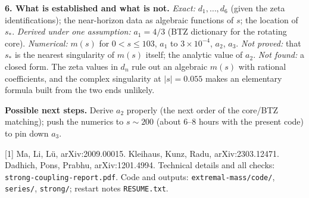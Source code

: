 \documentclass[10pt,a4paper]{article}
\begin{document}
\textbf{6. What is established and what is not.}
\emph{Exact:} $d_1,\dots,d_6$ (given the zeta identifications); the near-horizon data as algebraic
functions of $s$; the location of $s_*$. \emph{Derived under one assumption:} $a_1=4/3$ (BTZ dictionary
for the rotating core). \emph{Numerical:} $m(s)$ for $0<s\le103$, $a_1$ to $3\times10^{-4}$, $a_2$, $a_3$.
\emph{Not proved:} that $s_*$ is the nearest singularity of $m(s)$ itself; the analytic value of $a_2$.
\emph{Not found:} a closed form. The zeta values in $d_n$ rule out an algebraic $m(s)$ with rational coefficients, and the complex
singularity at $|s|=0.055$ makes an elementary formula built from the two ends unlikely.

\textbf{Possible next steps.} Derive $a_2$ properly (the next order of the core/BTZ matching); push the
numerics to $s\sim200$ (about 6--8 hours with the present code) to pin down $a_3$.

\vfill
{\footnotesize [1] Ma, Li, L\"u, arXiv:2009.00015. \quad
[2] Kleihaus, Kunz, Radu, arXiv:2303.12471. \quad
[3] Dadhich, Pons, Prabhu, arXiv:1201.4994. \quad
Technical details and all checks: \texttt{strong-coupling-report.pdf}. Code and outputs:
\texttt{extremal-mass/code/}, \texttt{series/}, \texttt{strong/}; restart notes \texttt{RESUME.txt}.}
\end{document}
